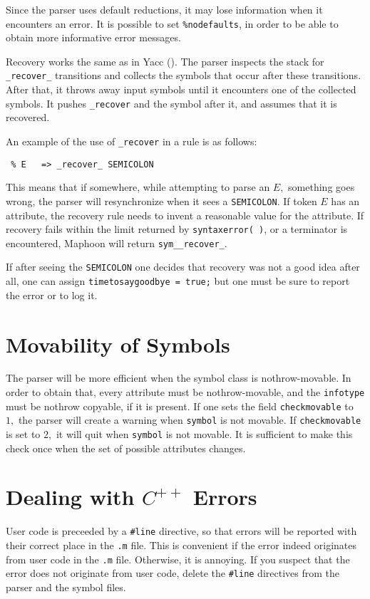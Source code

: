 \documentclass{article}
\begin{document}
Since the parser uses default reductions, it may lose
information when it encounters an error. It is possible
to set \verb+%nodefaults+, in order to be able to 
obtain more informative error messages. 

Recovery works the same as in Yacc (\cite{Yacc_system}). 
The parser
inspects the stack for \verb+_recover_+ transitions
and collects the symbols that occur after these transitions. 
After that, it throws away input symbols until it encounters
one of the collected symbols. 
It pushes \verb+_recover+ and
the symbol after it, and assumes that it is recovered. 

\noindent
An example of the use of \verb+_recover+ in a rule is as follows: 
\begin{verbatim}
 % E   => _recover_ SEMICOLON
\end{verbatim}
This means that if somewhere, while attempting to parse an $ E, $ 
something goes wrong, the 
parser will resynchronize when it sees a \verb+SEMICOLON+.
If token $ E $ has an attribute, the recovery rule needs to 
invent a reasonable value for the attribute.
If recovery fails within the limit returned by \verb+syntaxerror( )+, 
or a terminator is encountered,
Maphoon will return \verb+sym__recover_+. 

If after seeing the \verb+SEMICOLON+ one decides that recovery was not
a good idea after all, one can assign 
\verb+timetosaygoodbye = true;+ but one must be sure to
report the error or to log it.

\section{Movability of Symbols}

The parser will be more efficient when the symbol class is nothrow-movable.
In order to obtain that, every attribute must be nothrow-movable,
and the \verb+infotype+ must be nothrow copyable, if it is present. 
If one sets the field \verb+checkmovable+ to $ 1, $ the parser
will create a warning when \verb+symbol+ is not movable.
If \verb+checkmovable+ is set to $ 2, $ it will quit
when \verb+symbol+ is not movable. 
It is sufficient to make this check once when the set
of possible attributes changes. 


\section{Dealing with $ C^{++} $ Errors}

User code is preceeded by a \verb+#line+ directive,
so that errors will be reported with their correct place in
the \verb+.m+ file. This is convenient if the error
indeed originates from user code in the \verb+.m+ file.
Otherwise, it is annoying. If you suspect that
the error does not originate from user code, 
delete the \verb+#line+ directives from the parser
and the symbol files. 
\end{document}
